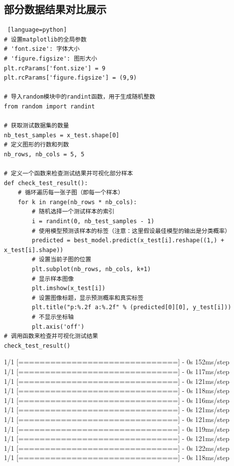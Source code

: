 \documentclass{article}
\begin{document}
\subsection{部分数据结果对比展示}
\begin{lstlisting} [language=python]
# 设置matplotlib的全局参数  
# 'font.size': 字体大小  
# 'figure.figsize': 图形大小  
plt.rcParams['font.size'] = 9  
plt.rcParams['figure.figsize'] = (9,9)  
  
# 导入random模块中的randint函数，用于生成随机整数  
from random import randint  
  
# 获取测试数据集的数量  
nb_test_samples = x_test.shape[0]  
# 定义图形的行数和列数  
nb_rows, nb_cols = 5, 5  
  
# 定义一个函数来检查测试结果并可视化部分样本  
def check_test_result():  
    # 循环遍历每一张子图（即每一个样本）  
    for k in range(nb_rows * nb_cols):  
        # 随机选择一个测试样本的索引  
        i = randint(0, nb_test_samples - 1)  
        # 使用模型预测该样本的标签（注意：这里假设最佳模型的输出是分类概率）  
        predicted = best_model.predict(x_test[i].reshape((1,) + x_test[i].shape))  
        # 设置当前子图的位置  
        plt.subplot(nb_rows, nb_cols, k+1)  
        # 显示样本图像  
        plt.imshow(x_test[i])  
        # 设置图像标题，显示预测概率和真实标签  
        plt.title("p:%.2f a:%.2f" % (predicted[0][0], y_test[i]))  
        # 不显示坐标轴  
        plt.axis('off')  
# 调用函数来检查并可视化测试结果  
check_test_result()
\end{lstlisting}
1/1 [==============================] - 0s 152ms/step\\
1/1 [==============================] - 0s 117ms/step\\
1/1 [==============================] - 0s 121ms/step\\
1/1 [==============================] - 0s 118ms/step\\
1/1 [==============================] - 0s 116ms/step\\
1/1 [==============================] - 0s 121ms/step\\
1/1 [==============================] - 0s 121ms/step\\
1/1 [==============================] - 0s 119ms/step\\
1/1 [==============================] - 0s 121ms/step\\
1/1 [==============================] - 0s 122ms/step\\
1/1 [==============================] - 0s 118ms/step\\
\end{document}
